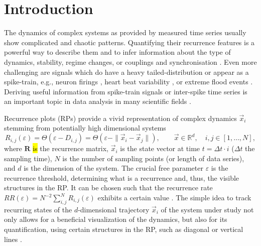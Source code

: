 \documentclass[entropy,article,accept,pdftex,moreauthors]{Definitions/mdpi}
\begin{document}
\section{Introduction}\label{sec_tau_rr_intro}

The dynamics of complex systems as provided by measured time series usually show complicated and chaotic patterns.
Quantifying their recurrence features is a powerful way to describe them and to infer information about 
the type of dynamics, stability, regime changes, or couplings and synchronisation \cite{marwan2007,marwan2008epjst,webber2015}.
Even more challenging are signals which do have a heavy tailed-distribution or appear as a spike-train,
e.g., neuron firings \cite{Dummer2014,Orcioni2020}, heart beat variability \cite{marwan2002herz}, 
or extreme flood events \cite{banerjee2021}.
Deriving useful information from spike-train signals or inter-spike time series is an important
topic in data analysis in many scientific fields \cite{Kajikawa2005,Dummer2014,Orcioni2020,Canale2021}.

Recurrence plots (RPs) provide a vivid representation of complex dynamics $\vec{x}_i$ stemming from potentially high dimensional systems \cite{marwan2007}
\begin{equation}\label{eq_rp_definition}
R_{i,j}(\varepsilon) = \Theta\left(\varepsilon - D_{i,j}\right) 
= \Theta\left(\varepsilon - \| \vec{x}_i - \vec{x}_j\|\right), \qquad \vec{x} \in \mathbb{R}^d, \quad i,j \in [1,\ldots, N],
\end{equation}
where $\mathbf{R}$ \hl{is} %
 the recurrence matrix, $\vec{x}_i$ is the state vector at time 
$t = \Delta t \cdot i$ ($\Delta t$ the sampling time), $N$ is the number of
sampling points (or length of data series), and $d$ is the dimension of the system.
The crucial free parameter $\varepsilon$ is the recurrence threshold, determining what is a recurrence
and, thus, the visible structures in the RP. It can be chosen such that the recurrence rate 
$RR(\varepsilon)=N^{-2}\sum_{i,j}^N R_{i,j}(\varepsilon)$ exhibits a certain value \cite{kraemer2018}.
The simple idea to track recurring states of the $d$-dimensional trajectory $\vec{x}_i$ of the system under study not only allows for a beneficial visualization of the dynamics, 
but also for its 
quantification, using certain structures in the RP, such as diagonal or vertical lines \cite{marwan2007}. 
\end{document}
